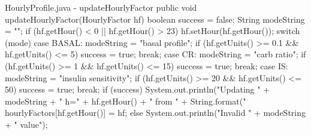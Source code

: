 \begin{javaCode}{HourlyProfile.java - updateHourlyFactor}
public void updateHourlyFactor(HourlyFactor hf) {
    boolean success = false;
    String modeString = "";
    if (hf.getHour() < 0 || hf.getHour() > 23)
        hf.setHour(hf.getHour());
    switch (mode) {
        case BASAL:
            modeString = "basal profile";
            if (hf.getUnits() >= 0.1 && hf.getUnits() <= 5)
                success = true;
            break;
        case CR:
            modeString = "carb ratio";
            if (hf.getUnits() >= 1 && hf.getUnits() <= 15)
                success = true;
            break;
        case IS:
            modeString = "insulin sensitivity";
            if (hf.getUnits() >= 20 && hf.getUnits() <= 50)
                success = true;
            break;
    }
    if (success) {
        System.out.println("Updating " + modeString + " h=" + hf.getHour() + " from " + String.format("%
        hourlyFactors[hf.getHour()] = hf;
    } else {
        System.out.println("Invalid " + modeString + " value");
    }
}
\end{javaCode}